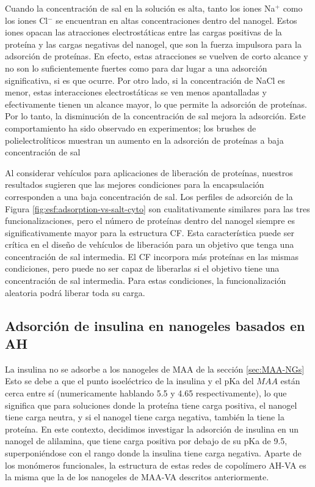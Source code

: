 Cuando la concentraci\'on de sal en la soluci\'on es alta, tanto los iones Na$^+$ como los iones Cl$^-$ se encuentran en altas concentraciones dentro del nanogel.
Estos iones opacan las atracciones electrost\'aticas entre las cargas positivas de la prote\'ina y las cargas negativas del nanogel, que son la fuerza impulsora para la adsorci\'on de prote\'inas.
En efecto, estas atracciones se vuelven de corto alcance y no son lo suficientemente fuertes como para dar lugar a una adsorci\'on significativa, si es que ocurre.
Por otro lado, si la concentraci\'on de NaCl es menor, estas interacciones electrost\'aticas se ven menos apantalladas y efectivamente tienen un alcance mayor, lo que permite la adsorci\'on de prote\'inas.
Por lo tanto, la disminuci\'on de la concentraci\'on de sal mejora la adsorci\'on.
Este comportamiento ha sido observado en experimentos; los brushes de  polielectrolíticos muestran un aumento en la adsorci\'on de prote\'inas a baja concentraci\'on de sal \cite{wittemann2006interaction,becker2012proteins, henzler2010adsorption,xu2018interaction}

Al considerar veh\'iculos para aplicaciones de liberaci\'on de prote\'inas, nuestros resultados sugieren que las mejores condiciones para la encapsulaci\'on corresponden a una baja concentraci\'on de sal.
Los perfiles de adsorci\'on de la Figura \ref{fig:esf:adsorption-vs-salt-cyto} son cualitativamente similares para las tres funcionalizaciones, pero el n\'umero de prote\'inas dentro del nanogel siempre es significativamente mayor para la estructura CF.
Esta caracter\'istica puede ser cr\'itica en el dise\~no de veh\'iculos de liberaci\'on para un objetivo que tenga una concentraci\'on de sal intermedia.
El CF incorpora m\'as prote\'inas en las mismas condiciones, pero puede no ser capaz de liberarlas si el objetivo tiene una concentraci\'on de sal intermedia.
Para estas condiciones, la funcionalizaci\'on aleatoria podr\'a liberar toda su carga.



\subsection{Adsorci\'on de insulina en nanogeles basados en  AH} 

La insulina no se adsorbe a los nanogeles de MAA de la secci\'on \ref{sec:MAA-NGs} %
Esto se debe a que el punto isoel\'ectrico de la insulina y el pKa del $MAA$ est\'an cerca entre s\'i (numericamente hablando 5.5 y 4.65 respectivamente), lo que significa que para soluciones donde la prote\'ina tiene carga positiva, el nanogel tiene carga neutra, y si el nanogel tiene carga negativa, tambi\'en la tiene la prote\'ina.
En este contexto, decidimos investigar la adsorci\'on de insulina en un nanogel de alilamina, que tiene carga positiva por debajo de su pKa de 9.5, superponi\'endose con el rango donde la insulina tiene carga negativa.
Aparte de los mon\'omeros funcionales, la estructura de estas redes de copol\'imero AH-VA es la misma que la de los nanogeles de MAA-VA descritos anteriormente.


